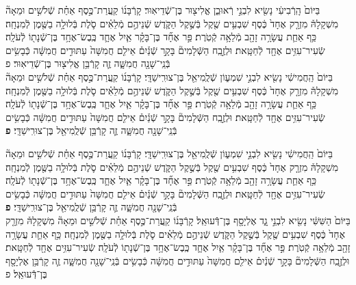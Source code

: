 \documentclass[twoside, openany, parskip=half, 11pt]{book}
\begin{document}
\begin{footnotesize}
\begin{multicols}{2}

בַּיּוֹם֙ הָֽרְֿבִיעִ֔י נָשִׂ֖יא לִבְנֵ֣י רְֿאוּבֵ֑ן אֱלִיצ֖וּר בֶּן־שְֿׁדֵיאֽוּר׃ קָרְֿבָּנ֜וֹ קַֽעֲרַת־כֶּ֣סֶף אַחַ֗ת שְֿׁלֹשִׁ֣ים וּמֵאָה֘ מִשְׁקָלָהּ֒ מִזְרָ֤ק אֶחָד֙ כֶּ֔סֶף שִׁבְעִ֥ים שֶׁ֖קֶל בְּֿשֶׁ֣קֶל הַקֹּ֑דֶשׁ שְֿׁנֵיהֶ֣ם מְֿלֵאִ֗ים סֹ֛לֶת בְּֿלוּלָ֥ה בַשֶּׁ֖מֶן לְֿמִנְחָֽה׃ כַּ֥ף אַחַ֛ת עֲשָׂרָ֥ה זָהָ֖ב מְֿלֵאָ֥ה קְֿטֹֽרֶת׃  פַּ֣ר אֶחָ֞ד בֶּן־בָּקָ֗ר אַ֧יִל אֶחָ֛ד כֶּֽבֶשׂ־אֶחָ֥ד בֶּן־שְֿׁנָת֖וֹ לְֿעֹלָֽה׃ שְֿׂעִיר־עִזִּ֥ים אֶחָ֖ד לְֿחַטָּֽאת׃ וּלְזֶ֣בַֽח הַשְּֿׁלָמִים֘ בָּקָ֣ר שְֿׁנַ֒יִם֒ אֵילִ֤ם חֲמִשָּׁה֙ עַתּוּדִ֣ים חֲמִשָּׁ֔ה כְּֿבָשִׂ֥ים בְּֿנֵֽי־שָׁנָ֖ה חֲמִשָּׁ֑ה זֶ֛ה קָרְֿבַּ֥ן אֱלִיצ֖וּר בֶּן־שְֿׁדֵיאֽוּר׃ פ\\
 בַּיּוֹם֙ הַֽחֲמִישִׁ֔י נָשִׂ֖יא לִבְנֵ֣י שִׁמְע֑וֹן שְֿׁלֻֽמִיאֵ֖ל בֶּן־צוּרִֽישַׁדָּֽי׃ קָרְֿבָּנ֜וֹ קַֽעֲרַת־כֶּ֣סֶף אַחַ֗ת שְֿׁלֹשִׁ֣ים וּמֵאָה֘ מִשְׁקָלָהּ֒ מִזְרָ֤ק אֶחָד֙ כֶּ֔סֶף שִׁבְעִ֥ים שֶׁ֖קֶל בְּֿשֶׁ֣קֶל הַקֹּ֑דֶשׁ שְֿׁנֵיהֶ֣ם מְֿלֵאִ֗ים סֹ֛לֶת בְּֿלוּלָ֥ה בַשֶּׁ֖מֶן לְֿמִנְחָֽה׃ כַּ֥ף אַחַ֛ת עֲשָׂרָ֥ה זָהָ֖ב מְֿלֵאָ֥ה קְֿטֹֽרֶת׃ פַּ֣ר אֶחָ֞ד בֶּן־בָּקָ֗ר אַ֧יִל אֶחָ֛ד כֶּֽבֶשׂ־אֶחָ֥ד בֶּן־שְֿׁנָת֖וֹ לְֿעֹלָֽה׃ שְֿׂעִיר־עִזִּ֥ים אֶחָ֖ד לְֿחַטָּֽאת׃ וּלְזֶ֣בַֽח הַשְּֿׁלָמִים֘ בָּקָ֣ר שְֿׁנַ֒יִם֒ אֵילִ֤ם חֲמִשָּׁה֙ עַתּוּדִ֣ים חֲמִשָּׁ֔ה כְּֿבָשִׂ֥ים בְּֿנֵֽי־שָׁנָ֖ה חֲמִשָּׁ֑ה זֶ֛ה קָרְֿבַּ֥ן שְֿׁלֻֽמִיאֵ֖ל בֶּן־צוּרִֽישַׁדָּֽי׃ \textbf{פ}

\vfill\null
\columnbreak


בַּיּוֹם֙ הַֽחֲמִישִׁ֔י נָשִׂ֖יא לִבְנֵ֣י שִׁמְע֑וֹן שְֿׁלֻֽמִיאֵ֖ל בֶּן־צוּרִֽישַׁדָּֽי׃ קָרְֿבָּנ֜וֹ קַֽעֲרַת־כֶּ֣סֶף אַחַ֗ת שְֿׁלֹשִׁ֣ים וּמֵאָה֘ מִשְׁקָלָהּ֒ מִזְרָ֤ק אֶחָד֙ כֶּ֔סֶף שִׁבְעִ֥ים שֶׁ֖קֶל בְּֿשֶׁ֣קֶל הַקֹּ֑דֶשׁ שְֿׁנֵיהֶ֣ם מְֿלֵאִ֗ים סֹ֛לֶת בְּֿלוּלָ֥ה בַשֶּׁ֖מֶן לְֿמִנְחָֽה׃ כַּ֥ף אַחַ֛ת עֲשָׂרָ֥ה זָהָ֖ב מְֿלֵאָ֥ה קְֿטֹֽרֶת׃  פַּ֣ר אֶחָ֞ד בֶּן־בָּקָ֗ר אַ֧יִל אֶחָ֛ד כֶּֽבֶשׂ־אֶחָ֥ד בֶּן־שְֿׁנָת֖וֹ לְֿעֹלָֽה׃ שְֿׂעִיר־עִזִּ֥ים אֶחָ֖ד לְֿחַטָּֽאת׃ וּלְזֶ֣בַֽח הַשְּֿׁלָמִים֘ בָּקָ֣ר שְֿׁנַ֒יִם֒ אֵילִ֤ם חֲמִשָּׁה֙ עַתּוּדִ֣ים חֲמִשָּׁ֔ה כְּֿבָשִׂ֥ים בְּֿנֵֽי־שָׁנָ֖ה חֲמִשָּׁ֑ה זֶ֛ה קָרְֿבַּ֥ן שְֿׁלֻֽמִיאֵ֖ל בֶּן־צוּרִֽישַׁדָּֽי׃ \textbf{פ} \\
 בַּיּוֹם֙ הַשִּׁשִּׁ֔י נָשִׂ֖יא לִבְנֵ֣י גָ֑ד אֶלְיָסָ֖ף בֶּן־דְּֿֿעוּאֵֽל׃ קָרְֿבָּנ֜וֹ קַֽעֲרַת־כֶּ֣סֶף אַחַ֗ת שְֿׁלֹשִׁ֣ים וּמֵאָה֘ מִשְׁקָלָהּ֒ מִזְרָ֤ק אֶחָד֙ כֶּ֔סֶף שִׁבְעִ֥ים שֶׁ֖קֶל בְּֿשֶׁ֣קֶל הַקֹּ֑דֶשׁ שְֿׁנֵיהֶ֣ם מְֿלֵאִ֗ים סֹ֛לֶת בְּֿלוּלָ֥ה בַשֶּׁ֖מֶן לְֿמִנְחָֽה׃ כַּ֥ף אַחַ֛ת עֲשָׂרָ֥ה זָהָ֖ב מְֿלֵאָ֥ה קְֿטֹֽרֶת׃ פַּ֣ר אֶחָ֞ד בֶּן־בָּקָ֗ר אַ֧יִל אֶחָ֛ד כֶּֽבֶשׂ־אֶחָ֥ד בֶּן־שְֿׁנָת֖וֹ לְֿעֹלָֽה׃ שְֿׂעִיר־עִזִּ֥ים אֶחָ֖ד לְֿחַטָּֽאת׃ וּלְזֶ֣בַֽח הַשְּֿׁלָמִים֘ בָּקָ֣ר שְֿׁנַ֒יִם֒ אֵילִ֤ם חֲמִשָּׁה֙ עַתּוּדִ֣ים חֲמִשָּׁ֔ה כְּֿבָשִׂ֥ים בְּֿנֵֽי־שָׁנָ֖ה חֲמִשָּׁ֑ה זֶ֛ה קָרְֿבַּ֥ן אֶלְיָסָ֖ף בֶּן־דְּֿֿעוּאֵֽל׃ פ


\end{multicols}
\end{footnotesize}
\end{document}
